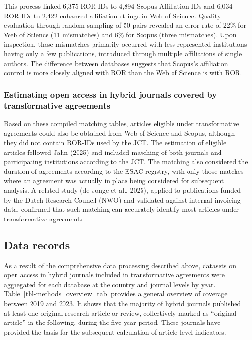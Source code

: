 \documentclass[a4paper,man,floatsintext,longtable,noextraspace,10pt]{apa6}
\begin{document}
This process linked 6,375 ROR-IDs to 4,894 Scopus Affiliation IDs and
6,034 ROR-IDs to 2,422 enhanced affiliation strings in Web of Science.
Quality evaluation through random sampling of 50 pairs revealed an error
rate of 22\% for Web of Science (11 mismatches) and 6\% for Scopus
(three mismatches). Upon inspection, these mismatches primarily occurred
with less-represented institutions having only a few publications,
introduced through multiple affiliations of single authors. The
difference between databases suggests that Scopus's affiliation control
is more closely aligned with ROR than the Web of Science is with ROR.

\subsubsection{Estimating open access in hybrid journals covered by
transformative
agreements}\label{estimating-open-access-in-hybrid-journals-covered-by-transformative-agreements}

Based on these compiled matching tables, articles eligible under
transformative agreements could also be obtained from Web of Science and
Scopus, although they did not contain ROR-IDs used by the JCT. The
estimation of eligible articles followed Jahn (2025) and included
matching of both journals and participating institutions according to
the JCT. The matching also considered the duration of agreements
according to the ESAC registry, with only those matches where an
agreement was actually in place being considered for subsequent
analysis. A related study (de Jonge et al., 2025), applied to
publications funded by the Dutch Research Council (NWO) and validated
against internal invoicing data, confirmed that such matching can
accurately identify most articles under transformative agreements.

\subsection{Data records}\label{data-records}

As a result of the comprehensive data processing described above,
datasets on open access in hybrid journals included in transformative
agreements were aggregated for each database at the country and journal
levels by year. Table~\ref{tbl-methods_overview_tab} provides a general
overview of coverage between 2019 and 2023. It shows that the majority
of hybrid journals published at least one original research article or
review, collectively marked as ``original article'' in the following,
during the five-year period. These journals have provided the basis for
the subsequent calculation of article-level indicators.
\end{document}
